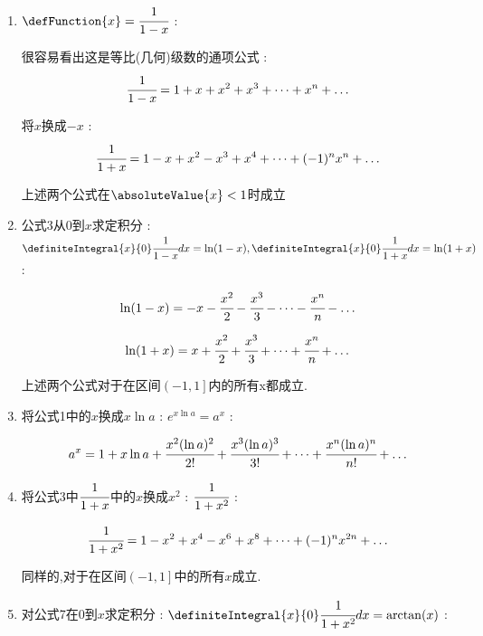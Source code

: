 {{{{\begin{enumerate}
{            总结规律,可知 : 展开式只有奇数次项,并且正负会交替出现 :
            $$
              \sin(x) = x - \cfrac{x^3}{3!} + \cfrac{x^5}{5!} - \cfrac{x^7}{7!} + \dots + (-1)^n\cfrac{x^{2n + 1}}{(2n + 1)!} + \dots
            $$

            由$\fDerivative{x} = g(x)$,对上式求导就会得到$\cos$的展开式 :
            $$
              \cos(x) = 1 - \cfrac{x^2}{2!} + \cfrac{x^4}{4!} - \cfrac{x^6}{6!} + \dots + (-1)^n\cfrac{x^{2n}}{(2n)!} + \dots
            $$

            特点是只有偶次项.
            }
      \item {
            $\defFunction{x} = \cfrac{1}{1 - x}$ :

            很容易看出这是等比(几何)级数的通项公式 :
            $$
              \cfrac{1}{1 - x} =1 + x + x^2 + x^3 + \dots + x^n + \dots
            $$

            将$x$换成$-x$ :
            $$
              \cfrac{1}{1 + x} = 1 - x + x^2 - x^3 + x^4 + \dots + (-1)^nx^n + \dots
            $$

            上述两个公式在$\absoluteValue{x} < 1$时成立
            }
      \item{
            公式3从$0$到$x$求定积分 : $\definiteIntegral{x}{0}\cfrac{1}{1 - x}dx = \ln(1 - x),\definiteIntegral{x}{0}\cfrac{1}{1 + x}dx = \ln(1 + x)$ :

            $$
              \ln(1 - x) = -x - \cfrac{x^2}{2} - \cfrac{x^3}{3} - \dots - \cfrac{x^n}{n} - \dots
            $$

            $$
              \ln(1 + x) = x + \cfrac{x^2}{2} + \cfrac{x^3}{3} + \dots + \cfrac{x^n}{n} + \dots
            $$

            上述两个公式对于在区间$\left(-1,1\right]$内的所有x都成立.
            }
      \item {
            将公式1中的$x$换成$x\ln a$ : $e^{x\ln a} = a^x$ :

            $$
              a^x = 1 + x\ln a + \cfrac{x^2(\ln a)^2}{2!} + \cfrac{x^3(\ln a)^3}{3!} + \dots + \cfrac{x^n(\ln a)^n}{n!} + \dots
            $$
            }
      \item{
            将公式3中$\cfrac{1}{1 + x}$中的$x$换成$x^2$ : $\cfrac{1}{1 + x^2}$ :

            $$
              \cfrac{1}{1 + x^2} = 1 - x^2 + x^4 - x^6 + x^8 + \dots + (-1)^nx^{2n} + \dots
            $$

            同样的,对于在区间$\left(-1,1\right]$中的所有$x$成立.
            }
      \item {
            对公式7在$0$到$x$求定积分 : $\definiteIntegral{x}{0}\cfrac{1}{1 + x^2}dx = \arctan(x)$  :

}
\end{enumerate}}}}}
